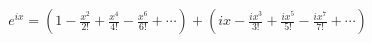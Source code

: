 \documentclass[preview]{standalone}
\begin{document}
\begin{align*}
e^{ix}= (1-\frac{x^2}{2!}+\frac{x^4}{4!}-\frac{x^6}{6!}+\cdots)+(ix-\frac{ix^3}{3!}+\frac{ix^5}{5!}-\frac{ix^7}{7!}+\cdots)
\end{align*}
\end{document}

